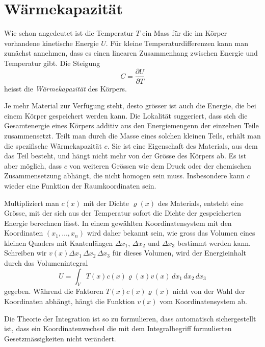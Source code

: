 %
%
%

%
%
\section{Wärmekapazität
\label{buch:fallstudie:waermekapazitaet}}
Wie schon angedeutet ist die Temperatur $T$ ein Mass für die im Körper
vorhandene kinetische Energie $U$.
%
Für kleine Temperaturdifferenzen kann man zunächst annehmen, dass
es einen linearen Zusammenhang zwischen Energie und Temperatur gibt.
Die Steigung 
\[
C
=
\frac{\partial U}{\partial T}
\]
heisst die {\em Wärmekapazität} des Körpers.
%

Je mehr Material zur Verfügung steht, desto grösser ist auch die Energie,
die bei einem Körper gespeichert werden kann.
Die Lokalität suggeriert, dass sich die Gesamtenergie eines Körpers 
additiv aus den Energiemengenn der einzelnen Teile zusammensetzt.
Teilt man durch die Masse eines solchen kleinen Teils, erhält man die
spezifische Wärmekapazität $c$.
Sie ist eine Eigenschaft des Materials, aus dem das Teil besteht,
und hängt nicht mehr von der Grösse des Körpers ab.
Es ist aber möglich, dass $c$ von weiteren Grössen wie dem Druck oder der
chemischen Zusammensetzung abhängt, die nicht homogen sein muss.
Insbesondere kann $c$ wieder eine Funktion der Raumkoordinaten sein.

Multipliziert man $c(x)$ mit der Dichte $\varrho(x)$ des Materials,
%
entsteht eine Grösse, mit der sich aus der Temperatur sofort die
Dichte der gespeicherten Energie berechnen lässt.
In einem gewählten Koordinatensystem mit den Koordinaten $(x_1,\dots,x_n)$
wird daher bekannt sein, wie gross das Volumen eines kleinen
Quaders mit Kantenlängen $\Delta x_1$, $\Delta x_2$ und $\Delta x_3$ 
bestimmt werden kann.
Schreiben wir $v(x) \Delta x_1\,\Delta x_2\,\Delta x_3$ für dieses 
Volumen, wird der Energieinhalt durch das Volumenintegral
\[
U
=
\int_V T(x) c(x)\varrho(x) v(x)\,dx_1\,dx_2\,dx_3
\]
gegeben.
Während die Faktoren $T(x) c(x) \varrho(x)$ nicht von der Wahl der
Koordinaten abhängt, hängt die Funktion $v(x)$ vom Koordinatensystem
ab.

\begin{aufgabe}
Die Theorie der Integration ist so zu formulieren, dass automatisch
sichergestellt ist, dass ein Koordinatenwechsel die mit dem Integralbegriff
formulierten Gesetzmässigkeiten nicht verändert.
\end{aufgabe}

